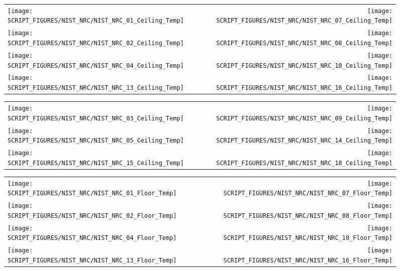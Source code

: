 \begin{figure}[p]
\begin{tabular*}{\textwidth}{l@{\extracolsep{\fill}}r}
\texttt{[image: SCRIPT\_FIGURES/NIST\_NRC/NIST\_NRC\_01\_Ceiling\_Temp]} &
\texttt{[image: SCRIPT\_FIGURES/NIST\_NRC/NIST\_NRC\_07\_Ceiling\_Temp]} \\
\texttt{[image: SCRIPT\_FIGURES/NIST\_NRC/NIST\_NRC\_02\_Ceiling\_Temp]} &
\texttt{[image: SCRIPT\_FIGURES/NIST\_NRC/NIST\_NRC\_08\_Ceiling\_Temp]} \\
\texttt{[image: SCRIPT\_FIGURES/NIST\_NRC/NIST\_NRC\_04\_Ceiling\_Temp]} &
\texttt{[image: SCRIPT\_FIGURES/NIST\_NRC/NIST\_NRC\_10\_Ceiling\_Temp]} \\
\texttt{[image: SCRIPT\_FIGURES/NIST\_NRC/NIST\_NRC\_13\_Ceiling\_Temp]} &
\texttt{[image: SCRIPT\_FIGURES/NIST\_NRC/NIST\_NRC\_16\_Ceiling\_Temp]}
\end{tabular*}
\label{NIST_NRC_Ceiling_Temp_Closed}
\end{figure}

\begin{figure}[p]
\begin{tabular*}{\textwidth}{l@{\extracolsep{\fill}}r}
\texttt{[image: SCRIPT\_FIGURES/NIST\_NRC/NIST\_NRC\_03\_Ceiling\_Temp]} &
\texttt{[image: SCRIPT\_FIGURES/NIST\_NRC/NIST\_NRC\_09\_Ceiling\_Temp]} \\
\texttt{[image: SCRIPT\_FIGURES/NIST\_NRC/NIST\_NRC\_05\_Ceiling\_Temp]} &
\texttt{[image: SCRIPT\_FIGURES/NIST\_NRC/NIST\_NRC\_14\_Ceiling\_Temp]} \\
\texttt{[image: SCRIPT\_FIGURES/NIST\_NRC/NIST\_NRC\_15\_Ceiling\_Temp]} &
\texttt{[image: SCRIPT\_FIGURES/NIST\_NRC/NIST\_NRC\_18\_Ceiling\_Temp]}
\end{tabular*}
\label{NIST_NRC_Ceiling_Temp_Open}
\end{figure}

\begin{figure}[p]
\begin{tabular*}{\textwidth}{l@{\extracolsep{\fill}}r}
\texttt{[image: SCRIPT\_FIGURES/NIST\_NRC/NIST\_NRC\_01\_Floor\_Temp]} &
\texttt{[image: SCRIPT\_FIGURES/NIST\_NRC/NIST\_NRC\_07\_Floor\_Temp]} \\
\texttt{[image: SCRIPT\_FIGURES/NIST\_NRC/NIST\_NRC\_02\_Floor\_Temp]} &
\texttt{[image: SCRIPT\_FIGURES/NIST\_NRC/NIST\_NRC\_08\_Floor\_Temp]} \\
\texttt{[image: SCRIPT\_FIGURES/NIST\_NRC/NIST\_NRC\_04\_Floor\_Temp]} &
\texttt{[image: SCRIPT\_FIGURES/NIST\_NRC/NIST\_NRC\_10\_Floor\_Temp]} \\
\texttt{[image: SCRIPT\_FIGURES/NIST\_NRC/NIST\_NRC\_13\_Floor\_Temp]} &
\texttt{[image: SCRIPT\_FIGURES/NIST\_NRC/NIST\_NRC\_16\_Floor\_Temp]}
\end{tabular*}
\label{NIST_NRC_Floor_Temp_Closed}
\end{figure}

